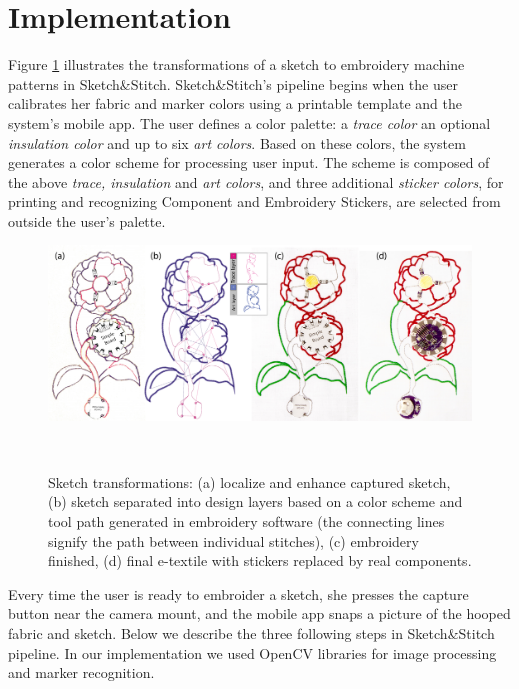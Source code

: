 \section{Implementation}

Figure \ref{fig:Flowers} illustrates the transformations of a sketch to embroidery machine patterns in Sketch\&Stitch. 
Sketch\&Stitch's pipeline begins when the user calibrates her fabric and marker colors using a printable template and the system's mobile app. The user defines a color palette: a \textit{trace color} an optional \textit{insulation color} and up to six \textit{art colors}. Based on these colors, the system generates a color scheme for processing user input. The scheme is composed of the above \textit{trace, insulation} and \textit{art colors}, and three additional \textit{sticker colors}, for printing and recognizing Component and Embroidery Stickers, are selected from outside the user's palette.

\begin{figure} [t!]
\centering
  \includegraphics[width=1\columnwidth]{figures/Flowers}
  \caption{Sketch transformations: (a) localize and enhance captured sketch, (b) sketch separated into design layers based on a color scheme and tool path generated in embroidery software (the connecting lines signify the path between individual stitches), (c) embroidery finished, (d) final e-textile with stickers replaced by real components.}~\label{fig:Flowers}
  \vspace{-2.5em}
  \end{figure}

Every time the user is ready to embroider a sketch, she presses the capture button near the camera mount, and the mobile app snaps a picture of the hooped fabric and sketch. Below we describe the three following steps in Sketch\&Stitch pipeline. In our implementation we used OpenCV libraries for image processing and marker recognition. 



